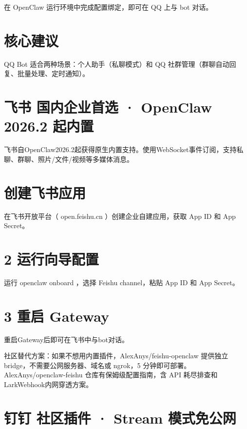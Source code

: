 \documentclass[
  10
]{article}
\begin{document}
在 OpenClaw 运行环境中完成配置绑定，即可在 QQ 上与 bot 对话。

\section{核心建议}\label{ux6838ux5fc3ux5efaux8bae-8}

QQ Bot 适合两种场景：个人助手（私聊模式）和 QQ
社群管理（群聊自动回复、批量处理、定时通知）。

\section{飞书 国内企业⾸选 · OpenClaw 2026.2
起内置}\label{ux98deux4e66-ux56fdux5185ux4f01ux4e1aux9009-openclaw-2026.2-ux8d77ux5185ux7f6e}

飞书自OpenClaw2026.2起获得原生内置支持。使用WebSocket事件订阅，支持私聊、群聊、照片/文件/视频等多媒体消息。

\section{创建飞书应用}\label{ux521bux5efaux98deux4e66ux5e94ux7528}

在飞书开放平台（ open.feishu.cn ）创建企业自建应用，获取 App ID 和 App
Secret。

\section{2 运行向导配置}\label{ux8fd0ux884cux5411ux5bfcux914dux7f6e}

运行 openclaw onboard ，选择 Feishu channel，粘贴 App ID 和 App Secret。

\section{3 重启 Gateway}\label{ux91cdux542f-gateway}

重启Gateway后即可在飞书中与bot对话。

社区替代方案：如果不想用内置插件，AlexAnys/feishu-openclaw 提供独立
bridge，不需要公网服务器、域名或 ngrok，5
分钟即可部署。AlexAnys/openclaw-feishu 仓库有保姆级配置指南，含 API
耗尽排查和 LarkWebhook内网穿透方案。

\section{钉钉 社区插件 · Stream
模式免公⽹}\label{ux9489ux9489-ux793eux533aux63d2ux4ef6-stream-ux6a21ux5f0fux514dux516c}
\end{document}
